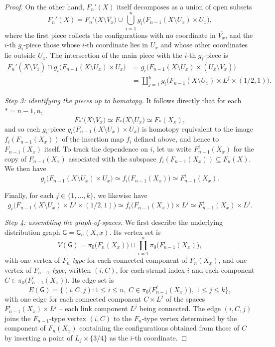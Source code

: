 \documentclass[10pt,a4paper]{amsart}
\newcommand\sfG{\mathsf{G}}
\begin{document}
\begin{proof}
On the other hand, \(F_n'(X)\) itself decomposes as a union of
open subsets
\[
F_n'(X)
=
F_n'\bigl(X\setminus \overline{V_x}\bigr)
\cup
\bigcup_{i=1}^n
g_i\bigl(F_{n-1}(X\setminus U_x)\times U_x\bigr),
\]
where the first piece collects the configurations with no
coordinate in \(\overline{V_x}\), and the \(i\)-th \(g_i\)-piece those
whose \(i\)-th coordinate lies in \(U_x\) and whose other coordinates
lie outside \(U_x\). The intersection of the main piece with the
\(i\)-th \(g_i\)-piece is
\begin{align*}
F_n'(X\setminus \overline{V_x})
\cap
g_i\bigl(F_{n-1}(X\setminus U_x)\times U_x\bigr)
&=
g_i\bigl(F_{n-1}(X\setminus U_x)\times (U_x\setminus \overline{V_x})\bigr)\\
&=
\coprod_{j=1}^k g_i\bigl(F_{n-1}(X\setminus U_x)\times L^j\times(1/2,1)\bigr).
\end{align*}

\smallskip
\noindent\emph{Step 3: identifying the pieces up to homotopy.}
It follows directly
that for each \(*=n-1, n\),
\[
F_*'\bigl(X\setminus \overline{V_x}\bigr)
\simeq
F_*\bigl(X\setminus U_x\bigr)
\simeq
F_*(X_x),
\]
and so 
each \(g_i\)-piece \(g_i\bigl(F_{n-1}(X\setminus U_x)\times U_x\bigr)\) is homotopy
equivalent to the image \(f_i(F_{n-1}(X_x))\) of the insertion map
\(f_i\) defined above, and hence to \(F_{n-1}(X_x)\) itself. 
To track the dependence on \(i\), let us
write \(F_{n-1}^i(X_x)\) for the copy of \(F_{n-1}(X_x)\) associated
with the subspace \(f_i(F_{n-1}(X_x))\subseteq F_n(X)\). We then have
\[
g_i\bigl(F_{n-1}(X\setminus U_x)\times U_x\bigr)
\simeq
f_i\bigl(F_{n-1}(X_x)\bigr)
\simeq
F_{n-1}^i(X_x).
\]

Finally, for each \(j\in\{1,\dots,k\}\), we likewise have
\[
g_i\bigl(F_{n-1}(X\setminus U_x)\times L^j\times(1/2,1)\bigr)
\simeq
f_i\bigl(F_{n-1}(X_x)\bigr)\times L^j
\simeq
F_{n-1}^i(X_x)\times L^j.
\]

\smallskip
\noindent\emph{Step 4: assembling the graph-of-spaces.}
We first describe the underlying distribution graph
\(\sfG=\sfG_n(X,x)\). Its vertex set is
\[
V(\sfG) = \pi_0\bigl(F_n(X_x)\bigr)\sqcup
\coprod_{i=1}^{n}\pi_0\bigl(F^i_{n-1}(X_x)\bigr),
\]
with one vertex of \emph{\(F_n\)-type} for each connected
component of \(F_n(X_x)\), and one vertex of
\emph{\(F_{n-1}\)-type}, written \((i,C)\), for each strand
index \(i\) and each component
\(C\in\pi_0\bigl(F^i_{n-1}(X_x)\bigr)\). Its edge set is
\[
E(\sfG) = \bigl\{(i,C,j) :
1\le i\le n,\ C\in\pi_0\bigl(F^i_{n-1}(X_x)\bigr),\
1\le j\le k\bigr\},
\]
with one edge for each connected component \(C\times L^j\) of
the spaces \(F^i_{n-1}(X_x)\times L^j\) -- each link component
\(L^j\) being connected. The edge \((i,C,j)\) joins the
\(F_{n-1}\)-type vertex \((i,C)\) to the \(F_n\)-type vertex
determined by the component of \(F_n(X_x)\) containing the
configurations obtained from those of \(C\) by inserting a
point of \(L_j\times\{3/4\}\) as the \(i\)-th coordinate.


\end{proof}
\end{document}

